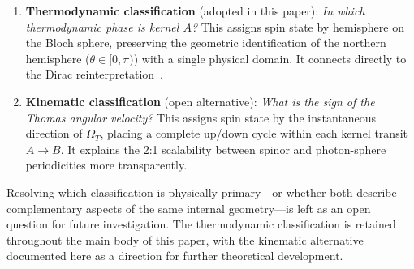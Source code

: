 \documentclass[%
 reprint,
 amsmath,amssymb,
 aps,
 prb,
]{revtex4-2}
\numberwithin{equation}{section}
\theoremstyle{definition}
\theoremstyle{remark}
\begin{document}
\begin{enumerate}
\item \textbf{Thermodynamic classification} (adopted in this paper):
  \emph{In which thermodynamic phase is kernel $A$?}
  This assigns spin state by hemisphere on the Bloch sphere,
  preserving the geometric identification of the northern hemisphere
  ($\theta \in [0, \pi)$) with a single physical domain.
  It connects directly to the Dirac reinterpretation~\cite{Hanamura_2018_01}.

\item \textbf{Kinematic classification} (open alternative):
  \emph{What is the sign of the Thomas angular velocity?}
  This assigns spin state by the instantaneous direction of $\Omega_T$,
  placing a complete up/down cycle within each kernel transit $A \to B$.
  It explains the 2:1 scalability between spinor and photon-sphere periodicities
  more transparently.
\end{enumerate}

Resolving which classification is physically primary---or whether both describe complementary aspects of the same internal geometry---is left as an open question for future investigation. The thermodynamic classification is retained throughout the main body of this paper, with the kinematic alternative documented here as a direction for further theoretical development.
\end{document}
